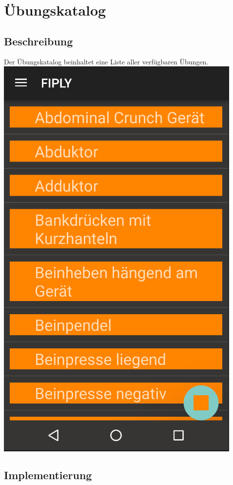 \documentclass[FIPLY_base.tex]{subfiles}
\begin{document}
\section{Übungskatalog}

\subsection{Beschreibung}
Der Übungskatalog beinhaltet eine Liste aller verfügbaren Übungen.
\ \\

\includegraphics[scale=0.4]{img/Uebungskatalog}

\subsection{Implementierung}
\end{document}
